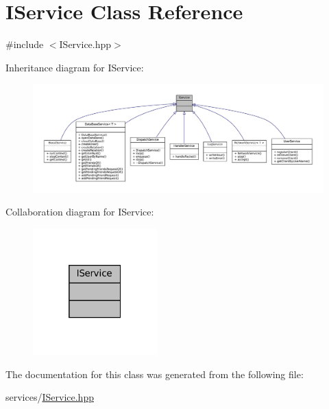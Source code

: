 \hypertarget{classIService}{}\section{I\+Service Class Reference}
\label{classIService}


{\ttfamily \#include $<$I\+Service.\+hpp$>$}



Inheritance diagram for I\+Service\+:
\nopagebreak
\begin{figure}[H]
\begin{center}
\leavevmode
\includegraphics[width=350pt]{classIService__inherit__graph}
\end{center}
\end{figure}


Collaboration diagram for I\+Service\+:
\nopagebreak
\begin{figure}[H]
\begin{center}
\leavevmode
\includegraphics[width=136pt]{classIService__coll__graph}
\end{center}
\end{figure}


The documentation for this class was generated from the following file\+:\begin{DoxyCompactItemize}
\item 
services/\mbox{\hyperlink{IService_8hpp}{I\+Service.\+hpp}}\end{DoxyCompactItemize}
